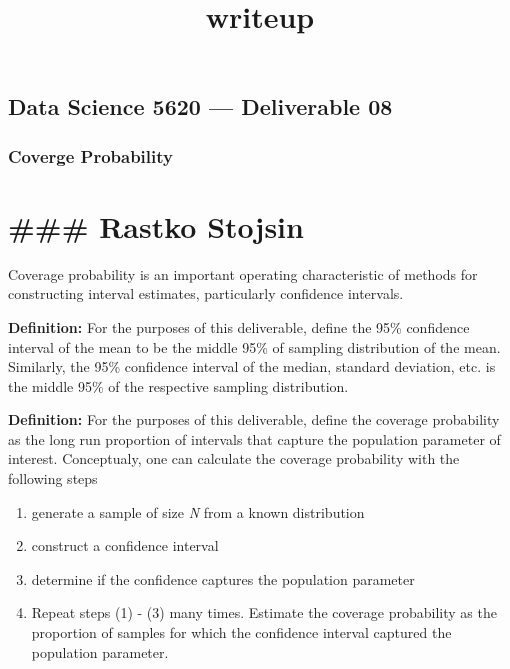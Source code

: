 \documentclass[]{article}
\title{writeup}
\author{}
\date{}
\providecommand{\tightlist}{%
  \setlength{\itemsep}{0pt}\setlength{\parskip}{0pt}}
\begin{document}
\maketitle

\hypertarget{data-science-5620-deliverable-08}{%
\subsection{Data Science 5620 --- Deliverable
08}\label{data-science-5620-deliverable-08}}

\hypertarget{coverge-probability}{%
\subsubsection{Coverge Probability}\label{coverge-probability}}

\hypertarget{rastko-stojsin}{%
\section{\#\#\# Rastko Stojsin}\label{rastko-stojsin}}

Coverage probability is an important operating characteristic of methods
for constructing interval estimates, particularly confidence intervals.

\textbf{Definition:} For the purposes of this deliverable, define the
95\% confidence interval of the mean to be the middle 95\% of sampling
distribution of the mean. Similarly, the 95\% confidence interval of the
median, standard deviation, etc. is the middle 95\% of the respective
sampling distribution.

\textbf{Definition:} For the purposes of this deliverable, define the
coverage probability as the long run proportion of intervals that
capture the population parameter of interest. Conceptualy, one can
calculate the coverage probability with the following steps

\begin{enumerate}
\def\labelenumi{\arabic{enumi}.}
\tightlist
\item
  generate a sample of size \emph{N} from a known distribution
\item
  construct a confidence interval
\item
  determine if the confidence captures the population parameter
\item
  Repeat steps (1) - (3) many times. Estimate the coverage probability
  as the proportion of samples for which the confidence interval
  captured the population parameter.
\end{enumerate}
\end{document}

